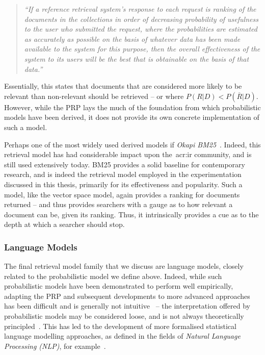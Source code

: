 \begin{quote}
\emph{``If a reference retrieval system's response to each request is ranking of the documents in the collections in order of decreasing probability of usefulness to the user who submitted the request, where the probabilities are estimated as accurately as possible on the basis of whatever data has been made available to the system for this purpose, then the overall effectiveness of the system to its users will be the best that is obtainable on the basis of that data.''}
\end{quote}

Essentially, this states that documents that are considered more likely to be relevant than non-relevant should be retrieved -- or where $P(R|D) < P(\overline{R}|D)$. However, while the PRP lays the much of the foundation from which probabilistic models have been derived, it does not provide its own concrete implementation of such a model.

Perhaps one of the most widely used derived models if \emph{Okapi BM25}~\citep{robertson1995trec3}. Indeed, this retrieval model has had considerable impact upon the~\gls{acr:ir} community, and is still used extensively today. BM25 provides a solid baseline for contemporary research, and is indeed the retrieval model employed in the experimentation discussed in this thesis, primarily for its effectiveness and popularity. Such a model, like the vector space model, again provides a ranking for documents returned -- and thus provides searchers with a gauge as to how relevant a document can be, given its ranking. Thus, it intrinsically provides a cue as to the depth at which a searcher should stop.

\subsubsection{Language Models}
The final retrieval model family that we discuss are language models, closely related to the probabilistic model we define above. Indeed, while such probabilistic models have been demonstrated to perform well empirically, adapting the PRP and subsequent developments to more advanced approaches has been difficult and is generally not intuitive~\citep{hiemstra2000language_modelling} -- the interpretation offered by probabilistic models may be considered loose, and is not always theoretically principled~\citep{whiting2015phd}. This has led to the development of more formalised statistical language modelling approaches, as defined in the fields of \emph{Natural Language Processing (NLP)}, for example~\citep{lavrenko2001language_models}.

